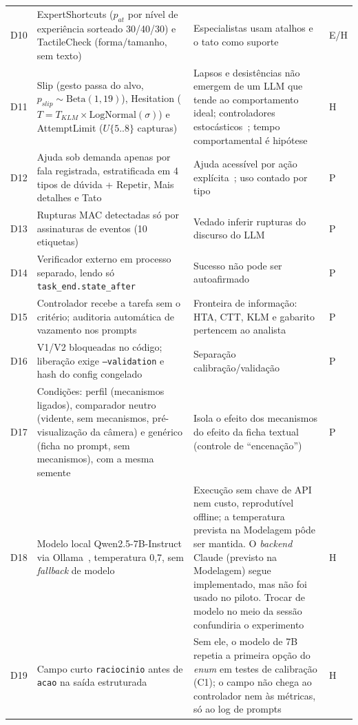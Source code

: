 \documentclass[conference]{IEEEtran}
\begin{document}
\begin{table}[t]
\begin{tabularx}{\textwidth}{>{\raggedright\arraybackslash}p{0.4cm} >{\raggedright\arraybackslash}p{4.6cm} X >{\centering\arraybackslash}p{0.7cm}}
D10 & ExpertShortcuts ($p_{at}$ por nível de experiência sorteado 30/40/30) e TactileCheck (forma/tamanho, sem texto) & Especialistas usam atalhos e o tato como suporte~\cite{tan2024} & E/H\\
D11 & Slip (gesto passa do alvo, $p_{slip}\sim\text{Beta}(1,19)$), Hesitation ($T=T_{KLM}\times\text{LogNormal}(\sigma)$) e AttemptLimit ($U\{5..8\}$ capturas) & Lapsos e desistências não emergem de um LLM que tende ao comportamento ideal; controladores estocásticos~\cite{laviola}; tempo comportamental é hipótese & H\\
D12 & Ajuda sob demanda apenas por fala registrada, estratificada em 4 tipos de dúvida + Repetir, Mais detalhes e Tato & Ajuda acessível por ação explícita~\cite{shneiderman}; uso contado por tipo & P\\
D13 & Rupturas MAC detectadas só por assinaturas de eventos (10 etiquetas) & Vedado inferir rupturas do discurso do LLM~\cite{enunciado,desouza} & P\\
D14 & Verificador externo em processo separado, lendo só \texttt{task\_end.state\_after} & Sucesso não pode ser autoafirmado & P\\
D15 & Controlador recebe a tarefa sem o critério; auditoria automática de vazamento nos prompts & Fronteira de informação: HTA, CTT, KLM e gabarito pertencem ao analista~\cite{dix,mackenzie} & P\\
D16 & V1/V2 bloqueadas no código; liberação exige \texttt{--validation} e hash do config congelado & Separação calibração/validação~\cite{modelagem} & P\\
D17 & Condições: perfil (mecanismos ligados), comparador neutro (vidente, sem mecanismos, pré-visualização da câmera) e genérico (ficha no prompt, sem mecanismos), com a mesma semente & Isola o efeito dos mecanismos do efeito da ficha textual (controle de ``encenação'') & P\\
D18 & Modelo local Qwen2.5-7B-Instruct via Ollama~\cite{qwen,ollama}, temperatura 0{,}7, sem \emph{fallback} de modelo & Execução sem chave de API nem custo, reprodutível offline; a temperatura prevista na Modelagem pôde ser mantida. O \emph{backend} Claude (previsto na Modelagem) segue implementado, mas não foi usado no piloto. Trocar de modelo no meio da sessão confundiria o experimento & H\\
D19 & Campo curto \texttt{raciocinio} antes de \texttt{acao} na saída estruturada & Sem ele, o modelo de 7B repetia a primeira opção do \emph{enum} em testes de calibração (C1); o campo não chega ao controlador nem às métricas, só ao log de prompts & H\\
\bottomrule
\end{tabularx}
\end{table}
\end{document}
